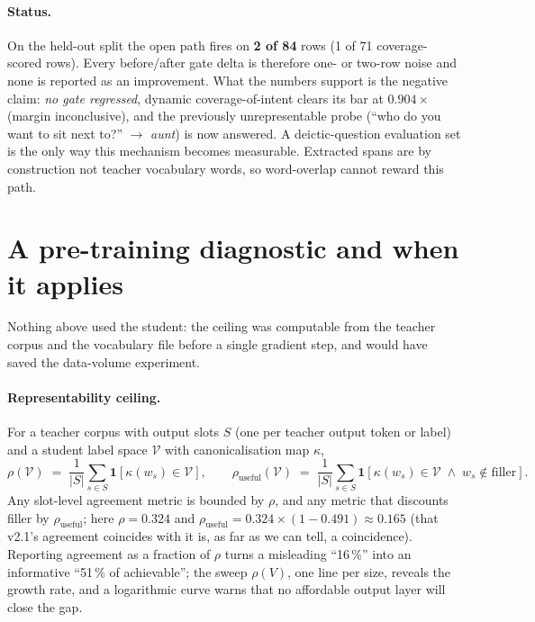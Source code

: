\documentclass{article}
\begin{document}
\paragraph{Status.} On the held-out split the open path fires on \textbf{2 of
84} rows (1 of 71 coverage-scored rows). Every before/after gate delta is
therefore one- or two-row noise and none is reported as an improvement. What
the numbers support is the negative claim: \emph{no gate regressed}, dynamic
coverage-of-intent clears its bar at $0.904\times$ (margin inconclusive), and the
previously unrepresentable probe (``who do you want to sit next to?'' $\to$
\emph{aunt}) is now answered. A deictic-question evaluation
set is the only way this mechanism becomes measurable. Extracted spans are by construction
not teacher vocabulary words, so word-overlap cannot reward this path.

\section{A pre-training diagnostic and when it applies}
\label{sec:general}
Nothing above used the student: the ceiling was computable from the teacher
corpus and the vocabulary file before a single gradient step, and would have
saved the data-volume experiment.

\paragraph{Representability ceiling.} For a teacher corpus with output slots
$S$ (one per teacher output token or label) and a student label space
$\mathcal{V}$ with canonicalisation map $\kappa$,
\begin{equation}
\rho(\mathcal V)\;=\;\frac{1}{|S|}\sum_{s\in S}\mathbf 1\!\left[\kappa(w_s)\in\mathcal V\right],
\qquad
\rho_{\text{useful}}(\mathcal V)\;=\;\frac{1}{|S|}\sum_{s\in S}\mathbf 1\!\left[\kappa(w_s)\in\mathcal V\;\wedge\;w_s\notin\text{filler}\right].
\label{eq:rho}
\end{equation}
Any slot-level agreement metric is bounded by $\rho$, and any metric that
discounts filler by $\rho_{\text{useful}}$; here $\rho=0.324$ and
$\rho_{\text{useful}}=0.324\times(1-0.491)\approx0.165$ (that v2.1's agreement
coincides with it is, as far as we can tell, a coincidence). Reporting
agreement as a fraction of $\rho$ turns a misleading ``16\,\%'' into an
informative ``51\,\% of achievable''; the sweep $\rho(V)$, one line per size,
reveals the growth rate, and a logarithmic curve warns that no affordable
output layer will close the gap.
\end{document}

